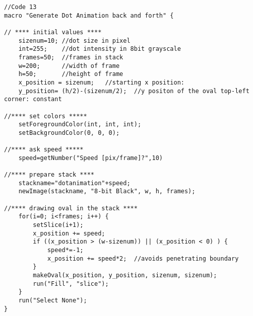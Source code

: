 \begin{lstlisting}[morekeywords={*, setForegroundColor, setBackgroundColor, if}]
//Code 13
macro "Generate Dot Animation back and forth" {

// **** initial values ****
	sizenum=10;	//dot size in pixel
	int=255;	//dot intensity in 8bit grayscale
	frames=50;	//frames in stack
	w=200;		//width of frame 
	h=50;		//height of frame 
	x_position = sizenum;	//starting x position: 
	y_position= (h/2)-(sizenum/2);	//y positon of the oval top-left corner: constant

//**** set colors *****
	setForegroundColor(int, int, int);
	setBackgroundColor(0, 0, 0);

//**** ask speed *****
	speed=getNumber("Speed [pix/frame]?",10)

//**** prepare stack ****
	stackname="dotanimation"+speed;	
	newImage(stackname, "8-bit Black", w, h, frames);

//**** drawing oval in the stack ****
	for(i=0; i<frames; i++) {
		setSlice(i+1);
		x_position += speed;
		if ((x_position > (w-sizenum)) || (x_position < 0) ) { 
			speed*=-1;
			x_position += speed*2;  //avoids penetrating boundary
		}
		makeOval(x_position, y_position, sizenum, sizenum);
		run("Fill", "slice");
	}
	run("Select None");
}


\end{lstlisting}